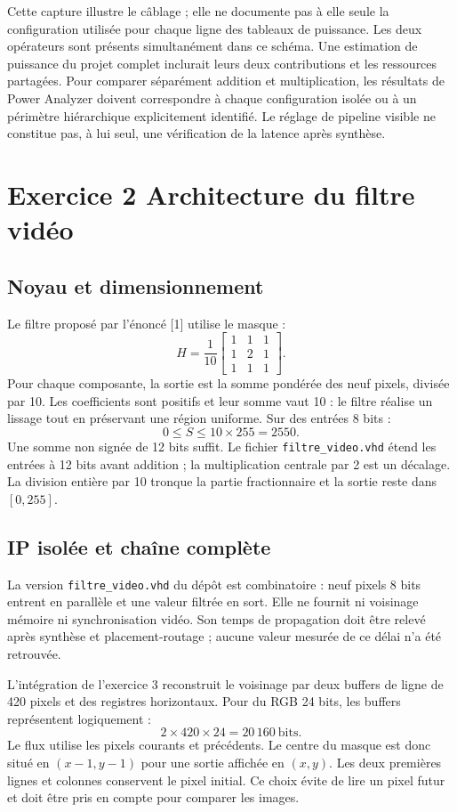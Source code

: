 \documentclass[11pt,a4paper]{article}
\begin{document}
Cette capture illustre le câblage ; elle ne documente pas à elle seule la configuration utilisée pour chaque ligne des tableaux de puissance. Les deux opérateurs sont présents simultanément dans ce schéma. Une estimation de puissance du projet complet inclurait leurs deux contributions et les ressources partagées. Pour comparer séparément addition et multiplication, les résultats de Power Analyzer doivent correspondre à chaque configuration isolée ou à un périmètre hiérarchique explicitement identifié. Le réglage de pipeline visible ne constitue pas, à lui seul, une vérification de la latence après synthèse.

\newpage
\endgroup\begingroup\small\section{Exercice 2 Architecture du filtre vidéo}
\subsection{Noyau et dimensionnement}
Le filtre proposé par l'énoncé [1] utilise le masque :
\[
 H=\frac1{10}
 \begin{bmatrix}
 1&1&1\\1&2&1\\1&1&1
 \end{bmatrix}.
\]
Pour chaque composante, la sortie est la somme pondérée des neuf pixels, divisée par 10. Les coefficients sont positifs et leur somme vaut 10 : le filtre réalise un lissage tout en préservant une région uniforme. Sur des entrées 8 bits :
\[
 0\leq S\leq 10\times255=2550.
\]
Une somme non signée de 12 bits suffit. Le fichier \texttt{filtre\_video.vhd} étend les entrées à 12 bits avant addition ; la multiplication centrale par 2 est un décalage. La division entière par 10 tronque la partie fractionnaire et la sortie reste dans $[0,255]$.

\subsection{IP isolée et chaîne complète}
La version \texttt{filtre\_video.vhd} du dépôt est combinatoire : neuf pixels 8 bits entrent en parallèle et une valeur filtrée en sort. Elle ne fournit ni voisinage mémoire ni synchronisation vidéo. Son temps de propagation doit être relevé après synthèse et placement-routage ; aucune valeur mesurée de ce délai n'a été retrouvée.

L'intégration de l'exercice 3 reconstruit le voisinage par deux buffers de ligne de 420 pixels et des registres horizontaux. Pour du RGB 24 bits, les buffers représentent logiquement :
\[
 2\times420\times24=20\,160\ \mathrm{bits}.
\]
Le flux utilise les pixels courants et précédents. Le centre du masque est donc situé en $(x-1,y-1)$ pour une sortie affichée en $(x,y)$. Les deux premières lignes et colonnes conservent le pixel initial. Ce choix évite de lire un pixel futur et doit être pris en compte pour comparer les images.
\end{document}
